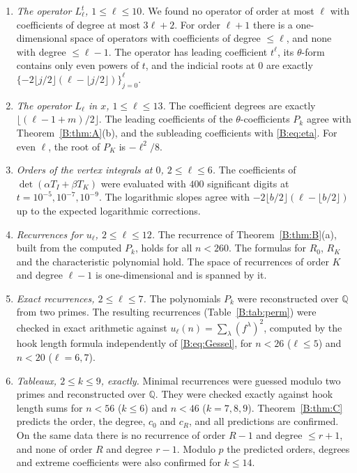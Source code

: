 \documentclass[11pt,a4paper]{article}
\theoremstyle{definition}
\theoremstyle{remark}
\newcommand{\Q}{\mathbb Q}
\newcommand{\fl}[1]{\lfloor #1\rfloor}
\numberwithin{equation}{section}
\begin{document}
\begin{enumerate}
\item \emph{The operator $L^t_\ell$, $1\le\ell\le10$.} We found no operator of order at most $\ell$ with coefficients of degree at most $3\ell+2$. For order $\ell+1$ there is a one-dimensional space of operators with coefficients of degree $\le\ell$, and none with degree $\le\ell-1$. The operator has leading coefficient $t^\ell$, its $\theta$-form contains only even powers of $t$, and the indicial roots at $0$ are exactly $\{-2\fl{j/2}(\ell-\fl{j/2})\}_{j=0}^{\ell}$.
\item \emph{The operator $L_\ell$ in $x$, $1\le\ell\le13$.} The coefficient degrees are exactly $\fl{(\ell-1+m)/2}$. The leading coefficients of the $\theta$-coefficients $P_k$ agree with Theorem~\ref{B:thm:A}(b), and the subleading coefficients with \eqref{B:eq:eta}. For even $\ell$, the root of $P_K$ is $-\ell^2/8$.
\item \emph{Orders of the vertex integrals at $0$, $2\le\ell\le6$.} The coefficients of $\det(\alpha T_I+\beta T_K)$ were evaluated with $400$ significant digits at $t=10^{-5},10^{-7},10^{-9}$. The logarithmic slopes agree with $-2\fl{b/2}(\ell-\fl{b/2})$ up to the expected logarithmic corrections.
\item \emph{Recurrences for $u_\ell$, $2\le\ell\le12$.} The recurrence of Theorem~\ref{B:thm:B}(a), built from the computed $P_k$, holds for all $n<260$. The formulas for $R_0$, $R_K$ and the characteristic polynomial hold. The space of recurrences of order $K$ and degree $\ell-1$ is one-dimensional and is spanned by it.
\item \emph{Exact recurrences, $2\le\ell\le7$.} The polynomials $P_k$ were reconstructed over $\Q$ from two primes. The resulting recurrences (Table~\ref{B:tab:perm}) were checked in exact arithmetic against $u_\ell(n)=\sum_\lambda(f^\lambda)^2$, computed by the hook length formula independently of \eqref{B:eq:Gessel}, for $n<26$ ($\ell\le5$) and $n<20$ ($\ell=6,7$).
\item \emph{Tableaux, $2\le k\le9$, exactly.} Minimal recurrences were guessed modulo two primes and reconstructed over $\Q$. They were checked exactly against hook length sums for $n<56$ ($k\le6$) and $n<46$ ($k=7,8,9$). Theorem~\ref{B:thm:C} predicts the order, the degree, $c_0$ and $c_R$, and all predictions are confirmed. On the same data there is no recurrence of order $R-1$ and degree $\le r+1$, and none of order $R$ and degree $r-1$. Modulo $p$ the predicted orders, degrees and extreme coefficients were also confirmed for $k\le14$.

\end{enumerate}
\end{document}
